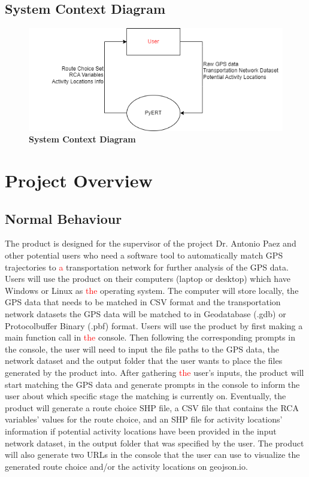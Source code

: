 \documentclass[12pt, titlepage]{article}
\begin{document}
\subsection{System Context Diagram}
\begin{figure}[!htbp]
    \centering
    \includegraphics[scale=0.60]{System_Context.png}
    \caption{\bf System Context Diagram}
\end{figure}
\newpage

\section{Project Overview}

\subsection{Normal Behaviour}
The product is designed for the supervisor of the project Dr. Antonio Paez and other potential users who need a software tool to automatically match GPS trajectories to \textcolor{red}{a} transportation network for further analysis of the GPS data. Users will use the product on their computers (laptop or desktop) which have Windows or Linux as \textcolor{red}{the} operating system. The computer will store locally, the GPS data that needs to be matched in CSV format and the transportation network datasets the GPS data will be matched to in Geodatabase (.gdb) or Protocolbuffer Binary (.pbf) format. Users will use the product by first making a main function call in \textcolor{red}{the} console. Then following the corresponding prompts in the console, the user will need to input the file paths to the GPS data, the network dataset and the output folder that the user wants to place the files generated by the product into. After gathering \textcolor{red}{the} user's inputs, the product will start matching the GPS data and generate prompts in the console to inform the user about which specific stage the matching is currently on. Eventually, the product will generate a route choice SHP file, a CSV file that contains the RCA variables' values for the route choice, and an SHP file for activity locations' information if potential activity locations have been provided in the input network dataset, in the output folder that was specified by the user. The product will also generate two URLs in the console that the user can use to visualize the generated route choice and/or the activity locations on geojson.io.
\end{document}
